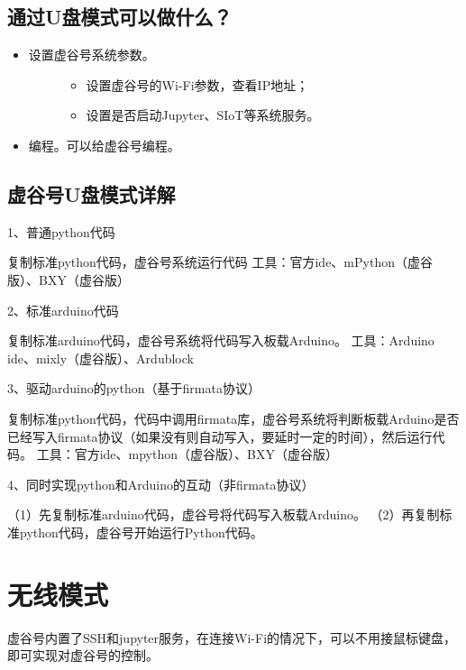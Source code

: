 \documentclass[letterpaper,10pt,english]{sphinxmanual}
\begin{document}
\subsection{通过U盘模式可以做什么？}
\label{\detokenize{02.quick/2.1-dap:id2}}\begin{itemize}
\item {} \begin{description}
\item[{设置虚谷号系统参数。}] \leavevmode\begin{itemize}
\item {} 
设置虚谷号的Wi-Fi参数，查看IP地址；

\item {} 
设置是否启动Jupyter、SIoT等系统服务。

\end{itemize}

\end{description}

\item {} 
编程。可以给虚谷号编程。

\end{itemize}


\subsection{虚谷号U盘模式详解}
\label{\detokenize{02.quick/2.1-dap:id3}}
1、普通python代码

复制标准python代码，虚谷号系统运行代码
工具：官方ide、mPython（虚谷版）、BXY（虚谷版）

2、标准arduino代码

复制标准arduino代码，虚谷号系统将代码写入板载Arduino。
工具：Arduino ide、mixly（虚谷版）、Ardublock

3、驱动arduino的python（基于firmata协议）

复制标准python代码，代码中调用firmata库，虚谷号系统将判断板载Arduino是否已经写入firmata协议（如果没有则自动写入，要延时一定的时间），然后运行代码。
工具：官方ide、mpython（虚谷版）、BXY（虚谷版）

4、同时实现python和Arduino的互动（非firmata协议）

（1）先复制标准arduino代码，虚谷号将代码写入板载Arduino。
（2）再复制标准python代码，虚谷号开始运行Python代码。


\section{无线模式}
\label{\detokenize{02.quick/2.2-wifi:id1}}\label{\detokenize{02.quick/2.2-wifi::doc}}
虚谷号内置了SSH和jupyter服务，在连接Wi-Fi的情况下，可以不用接鼠标键盘，即可实现对虚谷号的控制。
\end{document}
